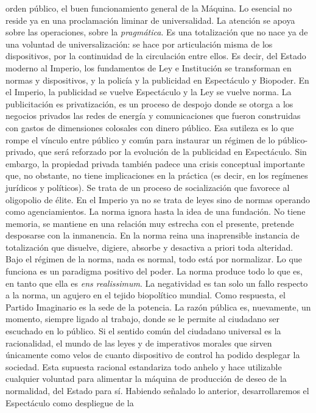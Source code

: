 \documentclass[
]{article}
\begin{document}
orden público, el buen funcionamiento general de la Máquina. Lo esencial
no reside ya en una proclamación liminar de universalidad. La atención
se apoya sobre las operaciones, sobre la \emph{pragmática}. Es una
totalización que no nace ya de una voluntad de universalización: se hace
por articulación misma de los dispositivos, por la continuidad de la
circulación entre ellos. Es decir, del Estado moderno al Imperio, los
fundamentos de Ley e Institución se transforman en normas y
dispositivos, y la policía y la publicidad en Espectáculo y Biopoder. En
el Imperio, la publicidad se vuelve Espectáculo y la Ley se vuelve
norma. La publicitación es privatización, es un proceso de despojo donde
se otorga a los negocios privados las redes de energía y comunicaciones
que fueron construidas con gastos de dimensiones colosales con dinero
público. Esa sutileza es lo que rompe el vínculo entre público y común
para instaurar un régimen de lo público-privado, que será reforzado por
la evolución de la publicidad en Espectáculo. Sin embargo, la propiedad
privada también padece una crisis conceptual importante que, no
obstante, no tiene implicaciones en la práctica (es decir, en los
regímenes jurídicos y políticos). Se trata de un proceso de
socialización que favorece al oligopolio de élite. En el Imperio ya no
se trata de leyes sino de normas operando como agenciamientos. La norma
ignora hasta la idea de una fundación. No tiene memoria, se mantiene en
una relación muy estrecha con el presente, pretende desposarse con la
inmanencia. En la norma reina una inaprensible instancia de totalización
que disuelve, digiere, absorbe y desactiva a priori toda alteridad. Bajo
el régimen de la norma, nada es normal, todo está por normalizar. Lo que
funciona es un paradigma positivo del poder. La norma produce todo lo
que es, en tanto que ella es \emph{ens realissimum}. La negatividad es
tan solo un fallo respecto a la norma, un agujero en el tejido
biopolítico mundial. Como respuesta, el Partido Imaginario es la sede de
la potencia. La razón pública es, nuevamente, un momento, siempre ligado
al trabajo, donde se le permite al ciudadano ser escuchado en lo
público. Si el sentido común del ciudadano universal es la racionalidad,
el mundo de las leyes y de imperativos morales que sirven únicamente
como velos de cuanto dispositivo de control ha podido desplegar la
sociedad. Esta supuesta racional estandariza todo anhelo y hace
utilizable cualquier voluntad para alimentar la máquina de producción de
deseo de la normalidad, del Estado para sí. Habiendo señalado lo
anterior, desarrollaremos el Espectáculo como despliegue de la
\end{document}
